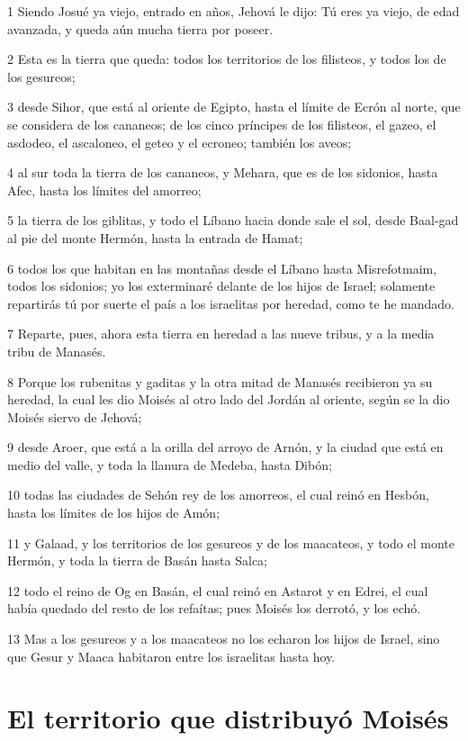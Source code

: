 \par 1 Siendo Josué ya viejo, entrado en años, Jehová le dijo: Tú eres ya viejo, de edad avanzada, y queda aún mucha tierra por poseer.
\par 2 Esta es la tierra que queda: todos los territorios de los filisteos, y todos los de los gesureos;
\par 3 desde Sihor, que está al oriente de Egipto, hasta el límite de Ecrón al norte, que se considera de los cananeos; de los cinco príncipes de los filisteos, el gazeo, el asdodeo, el ascaloneo, el geteo y el ecroneo; también los aveos;
\par 4 al sur toda la tierra de los cananeos, y Mehara, que es de los sidonios, hasta Afec, hasta los límites del amorreo;
\par 5 la tierra de los giblitas, y todo el Líbano hacia donde sale el sol, desde Baal-gad al pie del monte Hermón, hasta la entrada de Hamat;
\par 6 todos los que habitan en las montañas desde el Líbano hasta Misrefotmaim, todos los sidonios; yo los exterminaré delante de los hijos de Israel; solamente repartirás tú por suerte el país a los israelitas por heredad, como te he mandado.
\par 7 Reparte, pues, ahora esta tierra en heredad a las nueve tribus, y a la media tribu de Manasés.
\par 8 Porque los rubenitas y gaditas y la otra mitad de Manasés recibieron ya su heredad, la cual les dio Moisés al otro lado del Jordán al oriente, según se la dio Moisés siervo de Jehová;
\par 9 desde Aroer, que está a la orilla del arroyo de Arnón, y la ciudad que está en medio del valle, y toda la llanura de Medeba, hasta Dibón;
\par 10 todas las ciudades de Sehón rey de los amorreos, el cual reinó en Hesbón, hasta los límites de los hijos de Amón;
\par 11 y Galaad, y los territorios de los gesureos y de los maacateos, y todo el monte Hermón, y toda la tierra de Basán hasta Salca;
\par 12 todo el reino de Og en Basán, el cual reinó en Astarot y en Edrei, el cual había quedado del resto de los refaítas; pues Moisés los derrotó, y los echó.
\par 13 Mas a los gesureos y a los maacateos no los echaron los hijos de Israel, sino que Gesur y Maaca habitaron entre los israelitas hasta hoy.

\section*{El territorio que distribuyó Moisés}

